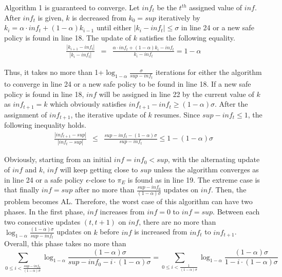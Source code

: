 
Algorithm 1 is guaranteed to converge. Let $inf_t$ be the $t^{th}$ assigned value of $inf$. After $inf_t$ is given, $k$ is decreased from $k_0=sup$ iteratively by $k_{i}=\alpha\cdot inf_t + (1 - \alpha)k_{i-1}$ until either $|k_i-inf_t|\leq \sigma$ in line 24 or a new safe policy is found in line 18. The update of $k$ satisfies the following equality.
\begin{eqnarray}
\frac{|k_{i+1} - inf_t|}{|k_i - inf_t|}&=& \frac{\alpha\cdot inf_t + (1 - \alpha)k_i - inf_t}{k_i - inf_t} =  1-\alpha
\end{eqnarray}

Thus, it takes no more than 1+$\log_{1-\alpha}\frac{\sigma}{sup - inf_t}$ iterations for either the algorithm to converge in line 24 or a new safe policy to be found in line 18. If a new safe policy is found in line 18, $inf$ will be assigned in line 22 by the current value of $k$ as $inf_{t+1}=k$ which obviously satisfies $inf_{t+1} - inf_t \geq(1-\alpha)\sigma$. After the assignment of $inf_{t+1}$, the iterative update of $k$ resumes. Since $sup-inf_t \leq 1$, the following inequality holds.
\begin{eqnarray}
\frac{|inf_{t+1} - sup|}{|inf_{t} - sup|}&\leq&\frac{sup -inf_{t} - (1-\alpha)\sigma}{sup- inf_{t}}\leq 1 - (1-\alpha)\sigma
\end{eqnarray}

Obviously, starting from an initial $inf=inf_0<sup$, with the alternating update of $inf$ and $k$, $inf$ will keep getting close to $sup$ unless the algorithm converges as in line 24 or a safe policy {$\epsilon$-close} to $\pi_E$ is found as in line 19. The extreme case is that finally $inf=sup$ after no more than $\frac{sup-inf_0}{(1-\alpha)\sigma}$ updates on $inf$. Then, the problem becomes AL. Therefore, the worst case of this algorithm can have two phases. In the first phase, $inf$ increases from $inf=0$ to $inf=sup$. Between each two consecutive updates $(t, t+1)$ on $inf$, there are no more than $\log_{1-\alpha}\frac{(1-\alpha)\sigma}{sup - inf_t}$ updates on $k$ before $inf$ is increased from $inf_t$ to $inf_{t+1}$. Overall, this phase takes no more than
\begin{equation}
{\underset{0\leq i< \frac{sup-inf_0}{(1-\alpha)\sigma}}{\sum}\log_{1-\alpha} \frac{(1-\alpha)\sigma}{sup-inf_0-i\cdot (1-\alpha)\sigma}} = {\underset{0\leq i< \frac{1}{(1-\alpha)\sigma}}{\sum}\log_{1-\alpha} \frac{(1-\alpha)\sigma}{1-i\cdot (1-\alpha)\sigma}}
\end{equation}

